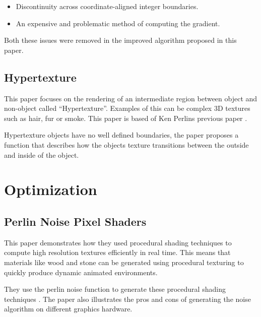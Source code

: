 \documentclass{scrartcl}
\begin{document}
\begin{itemize}
\item {Discontinuity across coordinate-aligned integer boundaries.}
\item  {An expensive and problematic method of computing the gradient.}
\end{itemize}

Both these issues were removed in the improved algorithm proposed in this paper.
\par 


\subsection{Hypertexture \cite{perlin1989hypertexture}}

This paper focuses on the rendering of an intermediate region between object and non-object called ``Hypertexture''.  Examples of this can be complex 3D textures such as hair, fur or smoke.
This paper is based of Ken Perlins previous paper \cite{perlin1985image}.

 Hypertexture objects have no well defined boundaries, the paper proposes a function that describes how the objects texture transitions between the outside and inside of the object.












\section{Optimization}

\subsection{Perlin Noise Pixel Shaders}
\cite{hart2001perlin}
\par

This paper demonstrates how they used procedural shading techniques to compute high resolution textures efficiently in real time. This means that materials like wood and stone can be generated using procedural texturing to quickly produce dynamic animated environments.

They use the perlin noise function to generate these procedural shading techniques \cite{perlin2002improving}. The paper also illustrates the pros and cons of generating the noise algorithm on different graphics hardware.
\par
\end{document}
